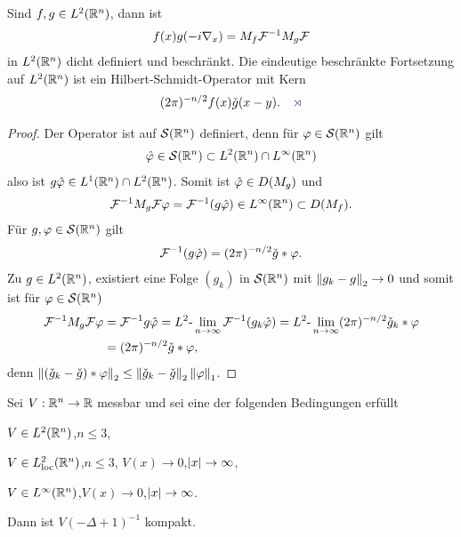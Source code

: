 \begin{prop}
\label{prop:7.6}
Sind $f,g\in L^2(\mathbb{R}^n)$, dann ist
\begin{align*}
f(x)g(-i\nabla_x) = M_f \mathcal{F}^{-1} M_g \mathcal{F}
\end{align*}
in $L^2(\mathbb{R}^n)$ dicht definiert und beschränkt. Die eindeutige beschränkte
Fortsetzung auf $L^2(\mathbb{R}^n)$ ist ein Hilbert-Schmidt-Operator mit Kern
\begin{align*}
(2\pi)^{-n/2} f(x)\check{g}(x-y).\fishhere
\end{align*}
\end{prop}
\begin{proof}
Der Operator ist auf $\mathcal{S}(\mathbb{R}^n)$ definiert, denn für $\varphi\in \mathcal{S}(\mathbb{R}^n)$ gilt
\begin{align*}
\hat{\varphi}\in \mathcal{S}(\mathbb{R}^n) \subset L^2(\mathbb{R}^n)\cap L^\infty(\mathbb{R}^n)
\end{align*}
also ist $g\hat{\varphi}\in L^1(\mathbb{R}^n)\cap L^2(\mathbb{R}^n)$. Somit ist $\hat{\varphi} \in
D(M_g)$ und
\begin{align*}
\mathcal{F}^{-1}M_g\mathcal{F}\varphi = \mathcal{F}^{-1}(g\hat{\varphi}) \in L^\infty(\mathbb{R}^n)\subset D(M_f).
\end{align*}
Für $g,\varphi\in \mathcal{S}(\mathbb{R}^n)$ gilt
\begin{align*}
\mathcal{F}^{-1}(g\hat{\varphi}) = (2\pi)^{-n/2}\check{g}*\varphi.
\end{align*}
Zu $g\in L^2(\mathbb{R}^n)$, existiert eine Folge $(g_k)$ in $\mathcal{S}(\mathbb{R}^n)$ mit
$\left\|g_k-g\right\|_2 \to 0$ und somit ist für $\varphi\in\mathcal{S}(\mathbb{R}^n)$
\begin{align*}
\mathcal{F}^{-1} M_g \mathcal{F} \varphi &= \mathcal{F}^{-1} g\hat{\varphi}
= L^2\text{-}\lim\limits_{n\to\infty} \mathcal{F}^{-1}(g_k \hat{\varphi})
= L^2\text{-}\lim\limits_{n\to\infty} (2\pi)^{-n/2} \check{g}_k * \varphi\\
&= (2\pi)^{-n/2} \check{g} * \varphi,
\end{align*}
denn $\left\|(\check{g}_k-\check{g})*\varphi\right\|_2 \le
\left\|\check{g}_k-\check{g}\right\|_2\left\|\varphi\right\|_1$.\qedhere
\end{proof}

\begin{lem}
\label{prop:7.7}
Sei $V:\mathbb{R}^n\to\mathbb{R}$ messbar und sei eine der folgenden Bedingungen erfüllt
\begin{equivenum}
\item\label{prop:7.7:1} $V\in L^2(\mathbb{R}^n)$,\qquad $n\le 3$,
\item\label{prop:7.7:2} $V\in L^2_\mathrm{loc}(\mathbb{R}^n)$,\qquad $n\le 3$,\quad
$V(x)\to 0$,\quad $\left|x\right|\to \infty$,
\item\label{prop:7.7:3} $V\in L^\infty(\mathbb{R}^n)$,\qquad $V(x)\to
0$,\quad$\left|x\right|\to \infty$.
\end{equivenum} 
Dann ist $V(-\Delta + 1)^{-1}$ kompakt.\fishhere
\end{lem}

